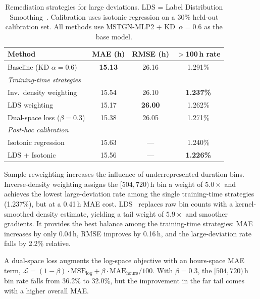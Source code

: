 \documentclass[conference]{IEEEtran}
\begin{document}
\begin{table}[t]
    \centering
    \caption{Remediation strategies for large deviations. LDS = Label Distribution Smoothing~\cite{yang2021lds}. Calibration uses isotonic regression on a 30\% held-out calibration set. All methods use MSTGN-MLP2 + KD~$\alpha{=}0.6$ as the base model.}
    \label{tab:remediation}
    \begin{tabular}{lccc}
        \toprule
        \textbf{Method} & \textbf{MAE (h)} & \textbf{RMSE (h)} & \textbf{$>$100\,h rate} \\
        \midrule
        Baseline (KD $\alpha{=}0.6$) & \textbf{15.13} & 26.16 & 1.291\% \\
        \midrule
        \multicolumn{4}{l}{\textit{Training-time strategies}} \\
        \quad Inv.\ density weighting & 15.54 & 26.10 & \textbf{1.237\%} \\
        \quad LDS weighting          & 15.17 & \textbf{26.00} & 1.262\% \\
        \quad Dual-space loss ($\beta{=}0.3$) & 15.38 & 26.05 & 1.271\% \\
        \midrule
        \multicolumn{4}{l}{\textit{Post-hoc calibration}} \\
        \quad Isotonic regression     & 15.63 & --- & 1.240\% \\
        \quad LDS + Isotonic          & 15.56 & --- & \textbf{1.226\%} \\
        \bottomrule
    \end{tabular}
\end{table}

Sample reweighting increases the influence of underrepresented duration bins. Inverse-density weighting assigns the $[504, 720)$\,h bin a weight of $5.0\times$ and achieves the lowest large-deviation rate among the single training-time strategies (1.237\%), but at a 0.41\,h MAE cost. LDS~\cite{yang2021lds} replaces raw bin counts with a kernel-smoothed density estimate, yielding a tail weight of $5.9\times$ and smoother gradients. It provides the best balance among the training-time strategies: MAE increases by only 0.04\,h, RMSE improves by 0.16\,h, and the large-deviation rate falls by 2.2\% relative.

A dual-space loss augments the log-space objective with an hours-space MAE term, $\mathcal{L} = (1{-}\beta) \cdot \text{MSE}_{\text{log}} + \beta \cdot \text{MAE}_{\text{hours}} / 100$. With $\beta = 0.3$, the $[504, 720)$\,h bin rate falls from 36.2\% to 32.0\%, but the improvement in the far tail comes with a higher overall MAE.
\end{document}
